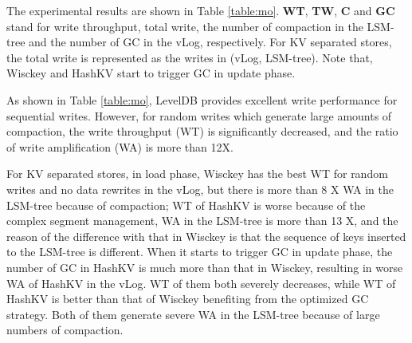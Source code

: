 \documentclass[sigconf]{acmart}
\begin{document}
The experimental results are shown in Table \ref{table:mo}. \textbf{WT}, \textbf{TW}, \textbf{C} and \textbf{GC} stand for write throughput, total write, the number of compaction in the LSM-tree and the number of GC in the vLog, respectively. For KV separated stores, the total write is represented as the writes in (vLog, LSM-tree). Note that, Wisckey and HashKV start to trigger GC in update phase.
\begin{table}[!t]
	\setlength{\abovecaptionskip}{0.cm}	
	\setlength{\belowcaptionskip}{-0.cm}
	\centering
	\caption{The negative impact of compaction and GC on write performance and write amplification. }
	\label{table:mo}
\end{table}

As shown in Table \ref{table:mo}, LevelDB provides excellent write performance for sequential writes. However, for random writes which generate large amounts of compaction, the write throughput (WT) is significantly decreased, and the ratio of write amplification (WA) is more than 12X. 

For KV separated stores, in load phase, Wisckey has the best WT for random writes and no data rewrites in the vLog, but there is more than 8 X WA in the LSM-tree because of compaction; WT of HashKV is worse because of the complex segment management, WA in the LSM-tree is more than 13 X, and the reason of the difference with that in Wisckey is that the sequence of keys inserted to the LSM-tree is different. When it starts to trigger GC in update phase, the number of GC in HashKV is much more than that in Wisckey, resulting in worse WA of HashKV in the vLog. WT of them both severely decreases, while WT of HashKV is better than that of Wisckey benefiting from the optimized GC strategy. Both of them generate severe WA in the LSM-tree because of large numbers of compaction. 
\end{document}
